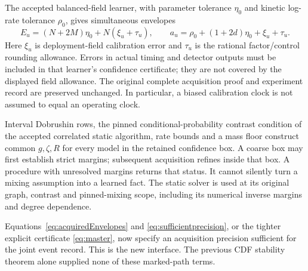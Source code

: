 The accepted balanced-field learner, with parameter tolerance $\eta_0$
and kinetic log-rate tolerance $\rho_0$, gives simultaneous envelopes
\begin{equation}
E_u=(N+2M)\eta_0+N(\xi_u+\tau_u),\qquad
a_u=\rho_0+(1+2d)\eta_0+\xi_u+\tau_u.
\label{eq:acquiredEnvelopes}
\end{equation}
Here $\xi_u$ is deployment-field calibration error and $\tau_u$ is
the rational factor/control rounding allowance. Errors in actual timing
and detector outputs must be included in that learner's confidence
certificate; they are not covered by the displayed field allowance.
The original complete acquisition proof and experiment record are
preserved unchanged. In particular, a biased calibration clock is not
assumed to equal an operating clock.

Interval Dobrushin rows, the pinned conditional-probability contrast
condition of the accepted correlated static algorithm, rate bounds and
a mass floor construct common $g,\zeta,R$ for every model in the
retained confidence box. A coarse box may first establish strict
margins; subsequent acquisition refines inside that box. A procedure
with unresolved margins returns that status. It cannot silently turn a
mixing assumption into a learned fact. The static solver is used at
its original graph, contrast and pinned-mixing scope, including its
numerical inverse margins and degree dependence.

Equations~\eqref{eq:acquiredEnvelopes} and
\eqref{eq:sufficientprecision}, or the tighter explicit certificate
\eqref{eq:master}, now specify an acquisition precision sufficient for
the joint event record. This is the new interface. The previous CDF
stability theorem alone supplied none of these marked-path terms.

